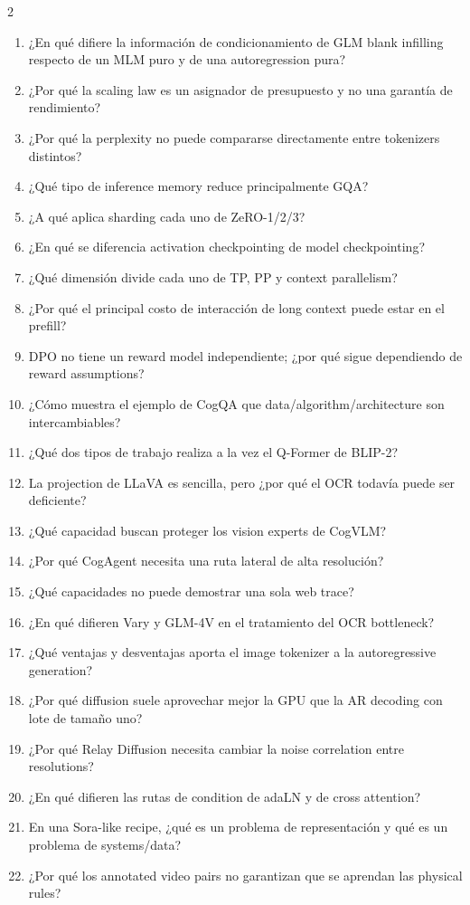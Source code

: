 \begin{multicols}{2}
\footnotesize
\begin{enumerate}
  \setlength{\itemsep}{0pt}
  \setlength{\parskip}{0pt}
  \item ¿En qué difiere la información de condicionamiento de GLM blank infilling respecto de un MLM puro y de una autoregression pura?
  \item ¿Por qué la scaling law es un asignador de presupuesto y no una garantía de rendimiento?
  \item ¿Por qué la perplexity no puede compararse directamente entre tokenizers distintos?
  \item ¿Qué tipo de inference memory reduce principalmente GQA?
  \item ¿A qué aplica sharding cada uno de ZeRO-1/2/3?
  \item ¿En qué se diferencia activation checkpointing de model checkpointing?
  \item ¿Qué dimensión divide cada uno de TP, PP y context parallelism?
  \item ¿Por qué el principal costo de interacción de long context puede estar en el prefill?
  \item DPO no tiene un reward model independiente; ¿por qué sigue dependiendo de reward assumptions?
  \item ¿Cómo muestra el ejemplo de CogQA que data/algorithm/architecture son intercambiables?
  \item ¿Qué dos tipos de trabajo realiza a la vez el Q-Former de BLIP-2?
  \item La projection de LLaVA es sencilla, pero ¿por qué el OCR todavía puede ser deficiente?
  \item ¿Qué capacidad buscan proteger los vision experts de CogVLM?
  \item ¿Por qué CogAgent necesita una ruta lateral de alta resolución?
  \item ¿Qué capacidades no puede demostrar una sola web trace?
  \item ¿En qué difieren Vary y GLM-4V en el tratamiento del OCR bottleneck?
  \item ¿Qué ventajas y desventajas aporta el image tokenizer a la autoregressive generation?
  \item ¿Por qué diffusion suele aprovechar mejor la GPU que la AR decoding con lote de tamaño uno?
  \item ¿Por qué Relay Diffusion necesita cambiar la noise correlation entre resolutions?
  \item ¿En qué difieren las rutas de condition de adaLN y de cross attention?
  \item En una Sora-like recipe, ¿qué es un problema de representación y qué es un problema de systems/data?
  \item ¿Por qué los annotated video pairs no garantizan que se aprendan las physical rules?
\end{enumerate}
\end{multicols}

